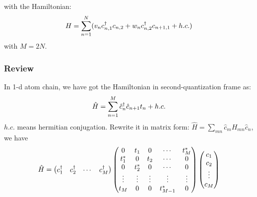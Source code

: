 \documentclass[letterpaper,10pt,english]{sphinxmanual}
\begin{document}
with the Hamiltonian:
\begin{gather}
\begin{split}H=\sum_{n=1}^N(v_n c_{n,1}^\dagger c_{n,2}+w_nc_{n,2}^\dagger c_{n+1,1}+h.c.)\end{split}\notag
\end{gather}
with \(M=2N\).


\subsubsection{Review}
\label{TI/Lecture notes/1:review}
In 1-d atom chain, we have got the Hamiltonian in second-quantization
frame as:
\begin{gather}
\begin{split}\hat{H}=\sum_{n=1}^M \hat{c}_n^\dagger \hat{c}_{n+1}t_n+h.c.\end{split}\notag
\end{gather}
\(h.c.\) means hermitian conjugation. Rewrite it in matrix form:
\(\hat{H}=\sum\limits_{mn}\hat{c}_m {H}_{mn}\hat{c}_n\), we have
\begin{gather}
\begin{split}\hat{H}=\begin{pmatrix}c_1^\dagger&c_2^\dagger&\cdots&c_M^\dagger \end{pmatrix}\begin{pmatrix} 0 & t_1 &0 & \cdots&t_M^*\\
t_1^* &0&t_2&\cdots&0\\
0&t_2^*&0&\cdots&0\\
\vdots&\vdots&\vdots&\vdots&\vdots\\
t_M&0&0&t_{M-1}^*&0
\end{pmatrix}\begin{pmatrix}c_1\\c_2\\\vdots\\c_M\end{pmatrix}\end{split}\notag
\end{gather}
\end{document}
